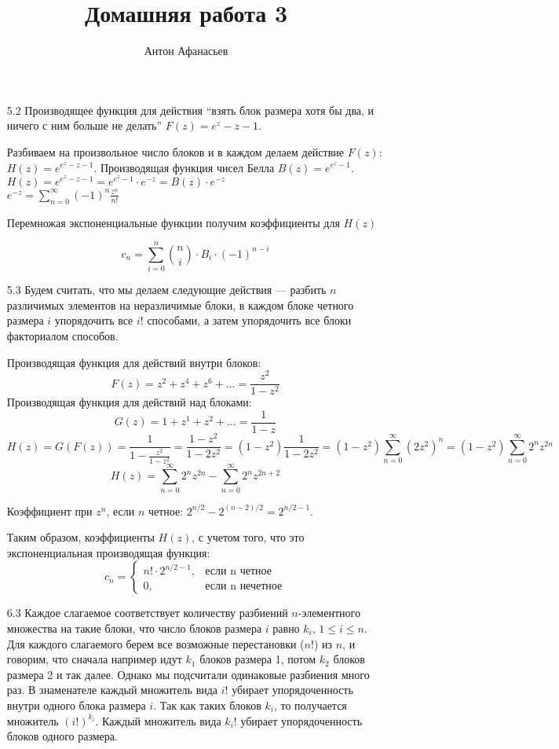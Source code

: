 \documentclass[10pt]{article}
\begin{document}
\title{Домашняя работа 3}
\author{Антон Афанасьев}
\maketitle

\begin{enumerate}
	\item[5.2] Производящее функция для действия ``взять блок размера хотя бы два, и ничего с ним больше не делать'' $F(z) = e^z - z - 1$.
	
	Разбиваем на произвольное число блоков и в каждом делаем действие $F(z)$: $H(z) = e^{e^z -z -1}$. Производящая функция чисел Белла $B(z) = e^{e^z - 1}$.\\
	$H(z) = e^{e^z -z -1} = e^{e^z - 1} \cdot e^{-z} = B(z) \cdot e^{-z}$\\
	$e^{-z} = \sum_{n=0}^{\infty} (-1)^n \frac{z^n}{n!}$
	
	Перемножая экспоненциальные функции получим коэффициенты для $H(z)$
	
	$$c_n = \sum_{i=0}^n \binom{n}{i} \cdot B_i \cdot(-1)^{n-i}$$
	
	\item[5.3] Будем считать, что мы делаем следующие действия --- разбить $n$ различимых элементов на  неразличимые блоки, в каждом блоке четного размера $i$ упорядочить все $i!$ способами, а затем упорядочить все блоки факториалом способов.
	
	Производящая функция для действий внутри блоков:
	$$F(z) = z^2 + z^4 + z^6 + \ldots = \frac{z^2}{1 - z^2}$$
	Производящая функция для действий над блоками:
	$$G(z) = 1 + z^1 + z^2 + \ldots = \frac{1}{1-z}$$
	$$H(z) = G(F(z)) = \frac{1}{1 - \frac{z^2}{1-z^2}} = \frac{1 - z^2}{1 - 2 z^2} = (1-z^2) \frac{1}{1-2z^2} = (1-z^2) \sum_{n=0}^{\infty} \left ( 2 z^2 \right ) ^ n = (1-z^2) \sum_{n=0}^{\infty} 2^n z^{2n}$$
	$$H(z) = \sum_{n=0}^{\infty} 2^n z^{2n}  - \sum_{n=0}^{\infty} 2^n z^{2n + 2}$$
	
	Коэффициент при $z^n$, если $n$ четное: $2^{n/2} - 2^{(n-2)/2} = 2^{n/2 - 1}$.
	
	Таким образом, коэффициенты $H(z)$, с учетом того, что это экспоненциальная производящая функция:
	$$
	c_n = 
		\begin{cases}
			n! \cdot 2^{n/2 - 1},&\text{если n четное}\\
			0,&\text{если n нечетное}
		\end{cases}
	$$
	
	\item[6.3] Каждое слагаемое соответствует количеству разбиений $n$-элементного множества на такие блоки, что число блоков размера $i$ равно $k_i$, $1 \le i \le n$. Для каждого слагаемого берем все возможные перестановки ($n!$) из $n$, и говорим, что сначала например идут $k_1$ блоков размера 1, потом $k_2$ блоков размера 2 и так далее. Однако мы подсчитали одинаковые разбиения много раз. В знаменателе каждый множитель вида $i!$ убирает упорядоченность внутри одного блока размера $i$. Так как таких блоков $k_i$, то получается множитель $(i!)^{k_i}$. Каждый множитель вида $k_i!$ убирает упорядоченность блоков одного размера.
\end{enumerate}
\end{document}
